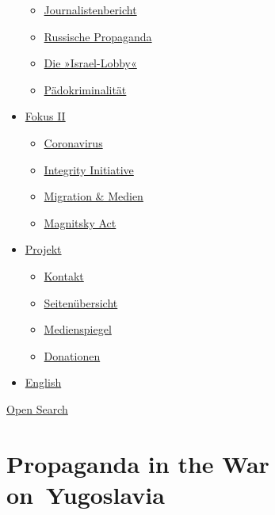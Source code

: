 \begin{itemize}
  \begin{itemize}
  \tightlist
  \item
    \href{https://swprs.org/bericht-eines-journalisten/}{Journalistenbericht}
  \item
    \href{https://swprs.org/russische-propaganda/}{Russische Propaganda}
  \item
    \href{https://swprs.org/die-israel-lobby-fakten-und-mythen/}{Die
    »Israel-Lobby«}
  \item
    \href{https://swprs.org/geopolitik-und-paedokriminalitaet/}{Pädokriminalität}
  \end{itemize}
\item
  \href{https://swprs.org/migration-und-medien/}{Fokus II}

  \begin{itemize}
  \tightlist
  \item
    \href{https://swprs.org/covid-19-hinweis-ii/}{Coronavirus}
  \item
    \href{https://swprs.org/die-integrity-initiative/}{Integrity
    Initiative}
  \item
    \href{https://swprs.org/migration-und-medien/}{Migration \& Medien}
  \item
    \href{https://swprs.org/der-fall-magnitsky/}{Magnitsky Act}
  \end{itemize}
\item
  \href{https://swprs.org/kontakt/}{Projekt}

  \begin{itemize}
  \tightlist
  \item
    \href{https://swprs.org/kontakt/}{Kontakt}
  \item
    \href{https://swprs.org/uebersicht/}{Seitenübersicht}
  \item
    \href{https://swprs.org/medienspiegel/}{Medienspiegel}
  \item
    \href{https://swprs.org/donationen/}{Donationen}
  \end{itemize}
\item
  \href{https://swprs.org/contact/}{English}
\end{itemize}

\protect\hyperlink{}{Open Search}

\hypertarget{propaganda-in-the-war-on-yugoslavia}{%
\section{Propaganda in the War
on~Yugoslavia}\label{propaganda-in-the-war-on-yugoslavia}}

